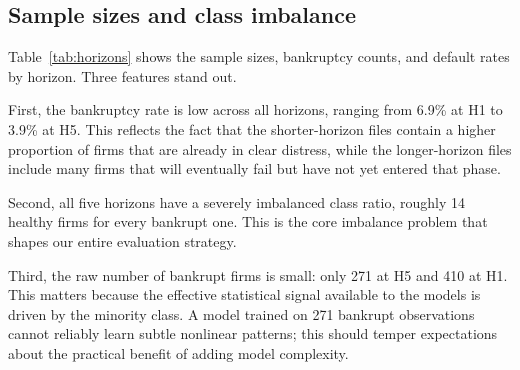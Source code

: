 \documentclass[12pt,a4paper]{article}
\begin{document}
\begin{table}[H]
\centering
\caption{Polish macroeconomic context, 2000--2013.\textsuperscript{*}}
\label{tab:polish-macro}
\small
{}
\caption*{\footnotesize \textsuperscript{*} GDP growth and CPI inflation are annual
percentages; unemployment is the registered year-end rate; the NBP reference
rate is the year-end policy rate. Sources: World Bank national accounts, GUS
(registered unemployment), National Bank of Poland.}
\end{table}

\subsection{Sample sizes and class imbalance}

Table~\ref{tab:horizons} shows the sample sizes, bankruptcy counts, and
default rates by horizon. Three features stand out.

First, the bankruptcy rate is low across all horizons, ranging from 6.9\%
at H1 to 3.9\% at H5. This reflects the fact that the shorter-horizon files
contain a higher proportion of firms that are already in clear distress,
while the longer-horizon files include many firms that will eventually fail
but have not yet entered that phase.

Second, all five horizons have a severely imbalanced class ratio, roughly
14 healthy firms for every bankrupt one. This is the core imbalance problem
that shapes our entire evaluation strategy.

Third, the raw number of bankrupt firms is small: only 271 at H5 and 410 at
H1. This matters because the effective statistical signal available to the
models is driven by the minority class. A model trained on 271 bankrupt
observations cannot reliably learn subtle nonlinear patterns; this should
temper expectations about the practical benefit of adding model complexity.
\end{document}
